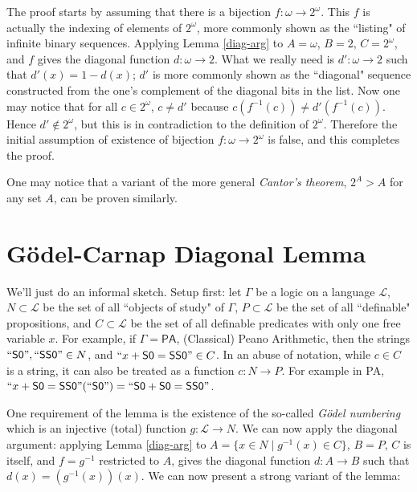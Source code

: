 \documentclass{article}
\begin{document}
The proof starts by assuming that there is a bijection $f:\omega \rightarrow 2^{\omega}$. This $f$ is actually the indexing of elements of $2^{\omega}$, more commonly shown as the ``listing" of infinite binary sequences. Applying Lemma \ref{diag-arg} to $A = \omega$, $B = 2$, $C = 2^{\omega}$, and $f$ gives the diagonal function $d:\omega \rightarrow 2$. What we really need is $d':\omega \rightarrow 2$ such that $d'(x) = 1 - d(x)$; $d'$ is more commonly shown as the ``diagonal" sequence constructed from the one's complement of the diagonal bits in the list. Now one may notice that for all $c \in 2^{\omega}$, $c \ne d'$ because $c(f^{-1}(c)) \ne d'(f^{-1}(c))$. Hence $d' \not\in 2^{\omega}$, but this is in contradiction to the definition of $2^{\omega}$. Therefore the initial assumption of existence of bijection $f:\omega \rightarrow 2^{\omega}$ is false, and this completes the proof.

One may notice that a variant of the more general \textit{Cantor's theorem}, $2^{A} > A$ for any set $A$, can be proven similarly.

\section{Gödel-Carnap Diagonal Lemma}
We'll just do an informal sketch. Setup first: let $\Gamma$ be a logic on a language $\mathcal{L}$, $N \subset \mathcal{L}$ be the set of all ``objects of study" of $\Gamma$, $P \subset \mathcal{L}$ be the set of all ``definable" propositions, and $C \subset \mathcal{L}$ be the set of all definable predicates with only one free variable $x$. For example, if $\Gamma = \textsf{PA}$, (Classical) Peano Arithmetic, then the strings $``\textsf{S0}", ``\textsf{SS0}" \in N$, and $``x + \textsf{S0} = \textsf{SS0}" \in C$. In an abuse of notation, while $c \in C$ is a string, it can also be treated as a function $c:N \rightarrow P$. For example in \textsf{PA}, $``x + \textsf{S0} = \textsf{SS0}"(``\textsf{S0}") = ``\textsf{S0} + \textsf{S0} = \textsf{SS0}"$.

One requirement of the lemma is the existence of the so-called \textit{Gödel numbering} which is an injective (total) function $g:\mathcal{L} \rightarrow N$. We can now apply the diagonal argument: applying Lemma \ref{diag-arg} to $A = \{x \in N \mid g^{-1}(x) \in C\}$, $B = P$, $C$ is itself, and $f = g^{-1}$ restricted to $A$, gives the diagonal function $d: A \rightarrow B$ such that $d(x) = (g^{-1}(x))(x)$. We can now present a strong variant of the lemma:
\end{document}
